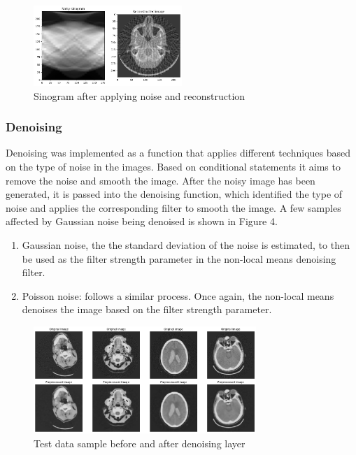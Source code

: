 \documentclass{article}
\begin{document}
\begin{par}
\begin{enumerate}
    \begin{figure}[h]
        \centering
        \includegraphics[width=0.5\textwidth]{sinogram_noise.png}
        \caption{Sinogram after applying noise and reconstruction} 
    \end{figure}
    \end{enumerate}
\end{par}

\newpage
\subsubsection{Denoising}
\begin{par}
    Denoising was implemented as a function that applies different techniques based on the type of noise in the images. Based on conditional statements it aims to remove the noise and smooth the image. 
    After the noisy image has been generated, it is passed into the denoising function, which identified the type of noise and applies the corresponding filter to smooth the image. A few samples affected by Gaussian noise being denoised is shown in Figure 4.
    \begin{enumerate}
        \item Gaussian noise, the the standard deviation of the noise is estimated, to then be used as the filter strength parameter in the non-local means denoising filter.
        \item Poisson noise: follows a similar process. Once again, the non-local means denoises the image based on the filter strength parameter. 
    \end{enumerate}
\end{par}

\begin{figure}[h]
    \centering
    \includegraphics[width=0.75\textwidth]{denoiser.png}
    \caption{Test data sample before and after denoising layer} 
\end{figure}
\end{document}

